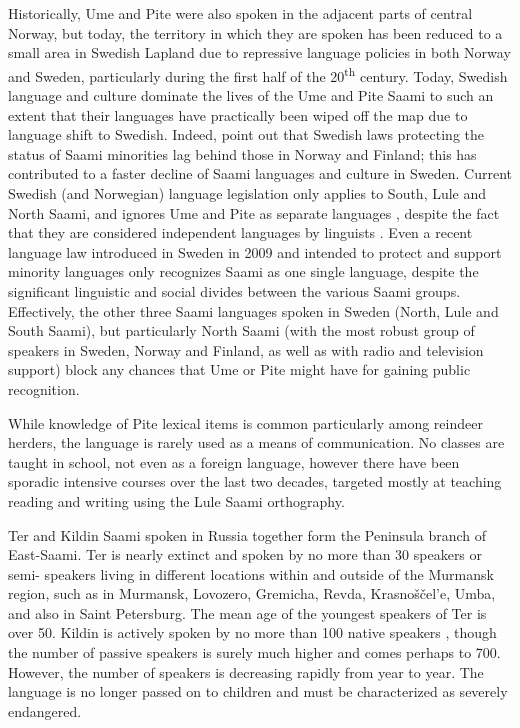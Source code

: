 \documentclass[a4paper,12pt]{article}
\begin{document}
Historically, Ume and Pite were also spoken in the adjacent parts of central Norway, but today, the territory in which they are spoken has been reduced to a small area in Swedish Lapland due to repressive language policies in both Norway and Sweden, particularly during the first half of the 20\textsuperscript{th} century. Today, Swedish language and culture dominate the lives of the Ume and Pite Saami to such an extent that their languages have practically been wiped off the map due to language shift to Swedish. Indeed, \citet[123]{blokland-etal2003} point out that Swedish laws protecting the status of Saami minorities lag behind those in Norway and Finland; this has contributed to a faster decline of Saami languages and culture in Sweden. Current Swedish (and Norwegian) language legislation only applies to South, Lule and North Saami, and ignores Ume and Pite as separate languages \cite[180]{seurujarvi-kari2005}, despite the fact that they are considered independent languages by linguists \citep[cf.][]{sammallahti1998b,salminen2007}. Even a recent language law introduced in Sweden in 2009 and intended to protect and support minority languages only recognizes Saami as one single language, despite the significant linguistic and social divides between the various Saami groups. Effectively, the other three Saami languages spoken in Sweden (North, Lule and South Saami), but particularly North Saami (with the most robust group of speakers in Sweden, Norway and Finland, as well as with radio and television support) block any chances that Ume or Pite might have for gaining public recognition. 

While knowledge of Pite lexical items is common particularly among reindeer herders, the language is rarely used as a means of communication. No classes are taught in school, not even as a foreign language, however there have been sporadic intensive courses over the last two decades, targeted mostly at teaching reading and writing using the Lule Saami orthography.

Ter and Kildin Saami spoken in Russia together form the Peninsula branch of East-Saami. Ter is nearly extinct and spoken by no more than 30 speakers or semi- speakers living in different locations within and outside of the Murmansk region, such as in Murmansk, Lovozero, Gremicha, Revda, Krasnoščel'e, Umba, and also in Saint Petersburg. The mean age of the youngest speakers of Ter is over 50. Kildin is actively spoken by no more than 100 native speakers \citep{scheller2010}, though the number of passive speakers is surely much higher and comes perhaps to 700. However, the number of speakers is decreasing rapidly from year to year. The language is no longer passed on to children and must be characterized as severely endangered.
\end{document}
